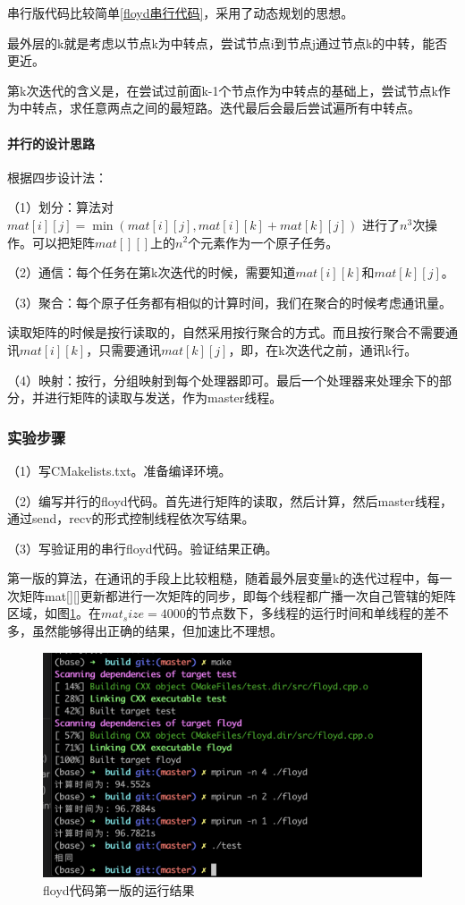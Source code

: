 \documentclass[10pt]{article}
\begin{document}
串行版代码比较简单\ref{floyd串行代码}，采用了动态规划的思想。

最外层的k就是考虑以节点k为中转点，尝试节点i到节点j通过节点k的中转，能否更近。

第k次迭代的含义是，在尝试过前面k-1个节点作为中转点的基础上，尝试节点k作为中转点，求任意两点之间的最短路。迭代最后会最后尝试遍所有中转点。

\paragraph{并行的设计思路} 

根据四步设计法：

（1）划分：算法对$mat[i][j] = \min(mat[i][j], mat[i][k] + mat[k][j])$ 进行了$n^{3}$次操作。可以把矩阵$mat[][]$上的$n^{2}$个元素作为一个原子任务。

（2）通信：每个任务在第k次迭代的时候，需要知道$mat[i][k]$和$mat[k][j]$。

（3）聚合：每个原子任务都有相似的计算时间，我们在聚合的时候考虑通讯量。

读取矩阵的时候是按行读取的，自然采用按行聚合的方式。而且按行聚合不需要通讯$mat[i][k]$，只需要通讯$mat[k][j]$，即，在k次迭代之前，通讯k行。

（4）映射：按行，分组映射到每个处理器即可。最后一个处理器来处理余下的部分，并进行矩阵的读取与发送，作为master线程。


\subsubsection{实验步骤}

（1）写CMakelists.txt。准备编译环境。

（2）编写并行的floyd代码。首先进行矩阵的读取，然后计算，然后master线程，通过send，recv的形式控制线程依次写结果。

（3）写验证用的串行floyd代码。验证结果正确。

第一版的算法，在通讯的手段上比较粗糙，随着最外层变量k的迭代过程中，每一次矩阵mat[][]更新都进行一次矩阵的同步，即每个线程都广播一次自己管辖的矩阵区域，如图\ref{floyd代码第一版的运行结果}。在$mat_size=4000$的节点数下，多线程的运行时间和单线程的差不多，虽然能够得出正确的结果，但加速比不理想。

\begin{figure}[htbp]
    \centering
    \includegraphics[width=.6\textwidth]{assets/floyd命令行运行界面.png}
    \caption{floyd代码第一版的运行结果}
    \label{floyd代码第一版的运行结果}
\end{figure}
\end{document}
